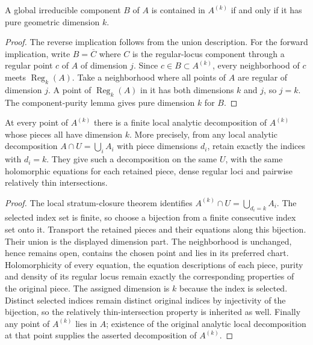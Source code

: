 \begin{lemma}
\label{hir:global-component-dimension-part-criterion}
\leanok
A global irreducible component $B$ of $A$ is contained in $A^{(k)}$ if and
only if it has pure geometric dimension $k$.
\end{lemma}
\begin{proof}
The reverse implication follows from the union description. For the forward
implication, write $B=\overline C$ where $C$ is the regular-locus component
through a regular point $c$ of $A$ of dimension $j$. Since $c\in B\subset
A^{(k)}$, every neighborhood of $c$ meets $\operatorname{Reg}_k(A)$. Take a
neighborhood where all points of $A$ are regular of dimension $j$. A point
of $\operatorname{Reg}_k(A)$ in it has both dimensions $k$ and $j$, so $j=k$.
The component-purity lemma gives pure dimension $k$ for $B$.
\end{proof}

\begin{theorem}
\label{hir:dimension-part-local-decomposition}
\leanok
At every point of $A^{(k)}$ there is a finite local analytic decomposition
of $A^{(k)}$ whose pieces all have dimension $k$. More precisely, from any
local analytic decomposition $A\cap U=\bigcup_i A_i$ with piece dimensions
$d_i$, retain exactly the indices with $d_i=k$. They give such a decomposition
on the same $U$, with the same holomorphic equations for each retained piece,
dense regular loci and pairwise relatively thin intersections.
\end{theorem}
\begin{proof}
The local stratum-closure theorem identifies
$A^{(k)}\cap U=\bigcup_{d_i=k} A_i$. The selected index set is finite, so
choose a bijection from a finite consecutive index set onto it. Transport
the retained pieces and their equations along this bijection. Their union
is the displayed dimension part. The neighborhood is unchanged, hence
remains open, contains the chosen point and lies in its preferred chart.
Holomorphicity of every equation, the equation descriptions of each piece,
purity and density of its regular locus remain exactly the corresponding
properties of the original piece. The assigned dimension is $k$ because
the index is selected. Distinct selected indices remain distinct original
indices by injectivity of the bijection, so the relatively thin-intersection
property is inherited as well. Finally any point of $A^{(k)}$ lies in $A$;
existence of the original analytic local decomposition at that point supplies
the asserted decomposition of $A^{(k)}$.
\end{proof}
